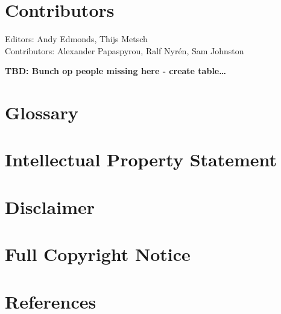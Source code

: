 \documentclass[10pt,a4paper]{article}
\begin{document}
%
%
%
%
%
%
%

\section{Contributors}

Editors: Andy Edmonds, Thijs Metsch \\
Contributors: Alexander Papaspyrou, Ralf Nyrén, Sam Johnston

\textbf{TBD: Bunch op people missing here - create table\ldots}

\section{Glossary}
\label{sec:glossary}


\section{Intellectual Property Statement}


\section{Disclaimer}


\section{Full Copyright Notice}


\section{References}



\end{document}

